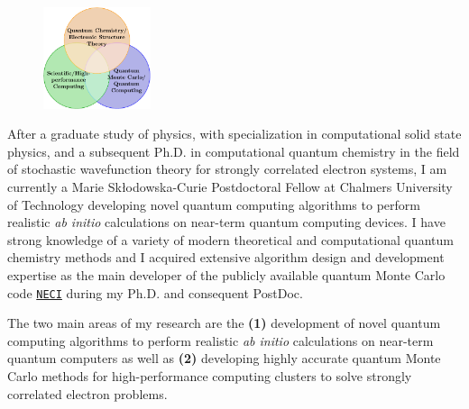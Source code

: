 \documentclass[11pt]{article}
\begin{document}
	
	
	\begin{figure}
		\vspace{-0.8cm}
		\includegraphics[width=0.28\textwidth]{venn}
	\end{figure}
	
	
	After a graduate study of physics, with specialization in computational solid state physics, and a subsequent Ph.D. in computational quantum chemistry in the
	field of stochastic wavefunction theory for strongly correlated electron systems,
	I am currently a Marie Skłodowska-Curie Postdoctoral Fellow at Chalmers University of Technology 
	developing novel quantum computing algorithms to perform realistic \emph{ab initio} calculations on 
	near-term quantum computing devices.
	I have strong knowledge of a variety of modern theoretical and computational quantum chemistry methods and I acquired
	extensive algorithm design and development expertise as the main developer of the publicly available quantum Monte
	Carlo code \href{https://github.com/ghb24/NECI_STABLE}{\texttt{NECI}} during my Ph.D. and consequent PostDoc.
	
	The two main areas of my research are the \textbf{(1)} development 
	of novel quantum computing algorithms to perform realistic 
	\emph{ab initio} calculations on 
	near-term quantum computers as well as 
	\textbf{(2)} developing highly accurate 
	quantum Monte Carlo methods for high-performance computing clusters to solve strongly correlated electron problems.
	
	
\end{document}
